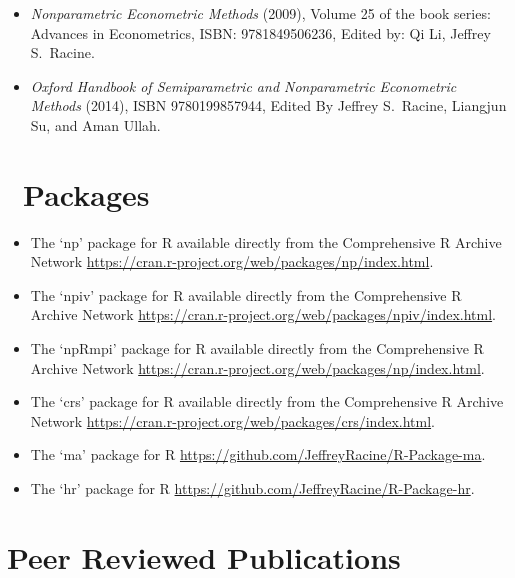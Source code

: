 \documentclass[
]{article}
\begin{document}
\begin{itemize}
\item
  \emph{Nonparametric Econometric Methods} (2009), Volume 25 of the book
  series: Advances in Econometrics, ISBN: 9781849506236, Edited by: Qi
  Li, Jeffrey S.~Racine.
\item
  \emph{Oxford Handbook of Semiparametric and Nonparametric Econometric
  Methods} (2014), ISBN 9780199857944, Edited By Jeffrey S.~Racine,
  Liangjun Su, and Aman Ullah.
\end{itemize}

\section*{\texorpdfstring{\faRProject~Packages}{~Packages}}\label{packages}

\begin{itemize}
\item
  The `np' package for R available directly from the Comprehensive R
  Archive Network
  \url{https://cran.r-project.org/web/packages/np/index.html}.
\item
  The `npiv' package for R available directly from the Comprehensive R
  Archive Network
  \url{https://cran.r-project.org/web/packages/npiv/index.html}.
\item
  The `npRmpi' package for R available directly from the Comprehensive R
  Archive Network
  \url{https://cran.r-project.org/web/packages/np/index.html}.
\item
  The `crs' package for R available directly from the Comprehensive R
  Archive Network
  \url{https://cran.r-project.org/web/packages/crs/index.html}.
\item
  The `ma' package for R
  \url{https://github.com/JeffreyRacine/R-Package-ma}.
\item
  The `hr' package for R
  \url{https://github.com/JeffreyRacine/R-Package-hr}.
\end{itemize}

\section*{Peer Reviewed Publications}\label{peer-reviewed-publications}
\end{document}
